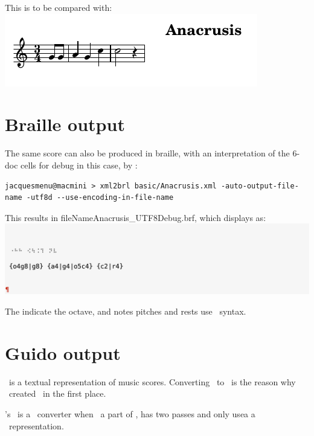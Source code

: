 This is to be compared with:\\
\includegraphics[scale=1]{../mfgraphics/mfgraphicsAnacrusis.png}


\section{Braille output}

The same score can also be produced in braille, with an interpretation of the 6-doc cells for debug in this case, by \xmlToBrl:
\begin{lstlisting}[language=Terminal]
jacquesmenu@macmini > xml2brl basic/Anacrusis.xml -auto-output-file-name -utf8d --use-encoding-in-file-name
\end{lstlisting}

This results in fileName{Anacrusis_UTF8Debug.brf}, which displays as:\\
\includegraphics[scale=1]{../mfgraphics/mfgraphicsAnacrusis_Braille.png}

The  indicate the octave, and notes pitches and rests use \lily\ syntax.


\section{Guido output}

\guido\ is a textual representation of music scores. Converting \mxml\ to \guido\ is the reason why \fober\ created \libmusicxml\ in the first place.

\mf's \xmlToGmn\ is a \multiPass\ converter when \xmlToGuido\, a part of \libmusicxml, has two passes and only usea a \mxsrRepr\ representation.

